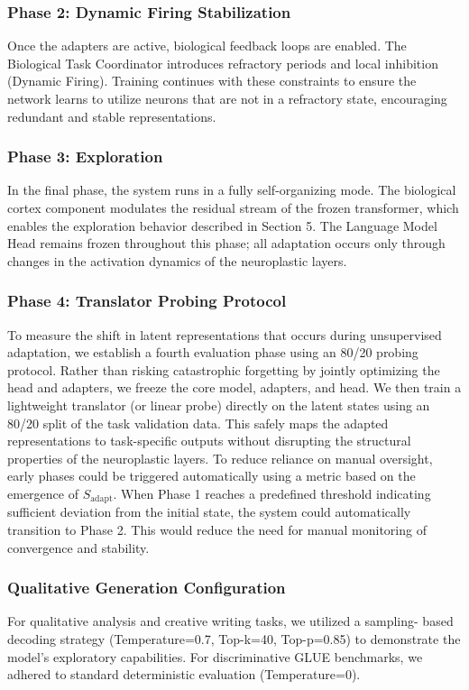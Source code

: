 \documentclass[11pt, letterpaper]{article}
\begin{document}
\subsubsection{Phase 2: Dynamic Firing Stabilization}
Once the adapters are active, biological feedback loops are enabled. The 
Biological Task Coordinator introduces refractory periods and local inhibition (Dynamic Firing). Training continues with these constraints to ensure the network learns to utilize neurons that are not in a refractory state, encouraging redundant and stable representations.

\subsubsection{Phase 3: Exploration}
In the final phase, the system runs in a fully self-organizing mode. The biological cortex component modulates the residual stream of the frozen transformer, which enables the exploration behavior described in Section 5. The Language Model Head remains frozen throughout this phase; all adaptation occurs only through changes in the activation dynamics of the neuroplastic layers.

\subsubsection{Phase 4: Translator Probing Protocol}
To measure the shift in latent representations that occurs during unsupervised adaptation, we establish a fourth evaluation phase using an 80/20 probing protocol. Rather than risking catastrophic forgetting by jointly optimizing the head and adapters, we freeze the core model, adapters, and head. We then train a lightweight translator (or linear probe) directly on the latent states using an 80/20 split of the task validation data. This safely maps the adapted representations to task-specific outputs without disrupting the structural properties of the neuroplastic layers.
To reduce reliance on manual oversight, early phases could be triggered automatically using a metric based on the emergence of $S_{\text{adapt}}$. When Phase 1 reaches a predefined threshold indicating sufficient deviation from the initial state, the system could automatically transition to Phase 2. This would reduce the need for manual monitoring of convergence and stability.

\subsubsection{Qualitative Generation Configuration}
For qualitative analysis and creative writing tasks, we utilized a sampling-
based decoding strategy (Temperature=0.7, Top-k=40, Top-p=0.85) to demonstrate the model's exploratory capabilities. For discriminative GLUE benchmarks, we adhered to standard deterministic evaluation (Temperature=0).
\end{document}

